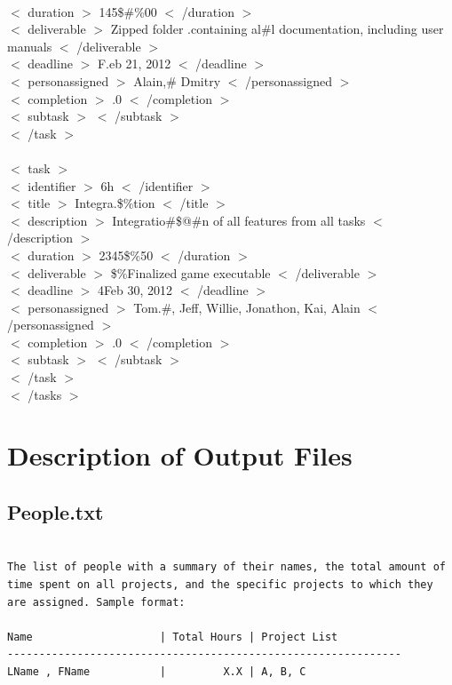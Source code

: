 \documentclass[12pt]{article}
\newcommand{\tab}{\hspace*{2em}}
\begin{document}
{\\ \tab    \tab $<$ duration $>$ 145\$\#\%00 $<$ /duration $>$ 
\\ \tab    \tab $<$ deliverable $>$ Zipped folder .containing al\#l documentation, including user manuals $<$ /deliverable $>$ 
\\ \tab    \tab $<$ deadline $>$ F.eb 21, 2012 $<$ /deadline $>$ 
\\ \tab    \tab $<$ personassigned $>$ Alain,\# Dmitry $<$ /personassigned $>$ 
\\ \tab    \tab $<$ completion $>$ .0 $<$ /completion $>$ 
\\ \tab    \tab $<$ subtask $>$  $<$ /subtask $>$ 
\\ \tab$<$ /task $>$ 
\\ 
\\ \tab$<$ task $>$ 
\\ \tab    \tab $<$ identifier $>$ 6h $<$ /identifier $>$ 
\\ \tab    \tab $<$ title $>$ Integra.\$\%tion $<$ /title $>$ 
\\ \tab    \tab $<$ description $>$ Integratio\#\$@\#n of all features from all tasks $<$ /description $>$ 
\\ \tab    \tab $<$ duration $>$ 2345\$\%50 $<$ /duration $>$ 
\\ \tab    \tab $<$ deliverable $>$ \$\%Finalized game executable $<$ /deliverable $>$ 
\\ \tab    \tab $<$ deadline $>$ 4Feb 30, 2012 $<$ /deadline $>$ 
\\ \tab    \tab $<$ personassigned $>$ Tom.\#, Jeff, Willie, Jonathon, Kai, Alain $<$ /personassigned $>$ 
\\ \tab    \tab $<$ completion $>$ .0 $<$ /completion $>$ 
\\ \tab    \tab $<$ subtask $>$  $<$ /subtask $>$ 
\\ \tab$<$ /task $>$ 
\\ $<$ /tasks $>$ 
}

\section{Description of Output Files}
\subsection{People.txt}
\begin{lstlisting}

The list of people with a summary of their names, the total amount of time spent on all projects, and the specific projects to which they are assigned. Sample format:

Name                    | Total Hours | Project List
--------------------------------------------------------------
LName , FName           |         X.X | A, B, C

\end{lstlisting}
\end{document}
